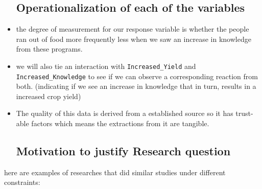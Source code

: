 \documentclass[
  letterpaper,
  DIV=11,
  numbers=noendperiod]{scrartcl}
\begin{document}
\begin{itemize}
  \hypertarget{operationalization-of-each-of-the-variables}{%
  \subsection{Operationalization of each of the
  variables}\label{operationalization-of-each-of-the-variables}}
\item
  the degree of measurement for our response variable is whether the
  people ran out of food more frequently less when we saw an increase in
  knowledge from these programs.
\item
  we will also tie an interaction with \texttt{Increased\_Yield} and
  \texttt{Increased\_Knowledge} to see if we can observe a corresponding
  reaction from both. (indicating if we see an increase in knowledge
  that in turn, results in a increased crop yield)
\item
  The quality of this data is derived from a established source so it
  has trust-able factors which means the extractions from it are
  tangible.

  \hypertarget{motivation-to-justify-research-question}{%
  \subsection{Motivation to justify Research
  question}\label{motivation-to-justify-research-question}}
\end{itemize}

here are examples of researches that did similar studies under different
constraints:
\end{document}
